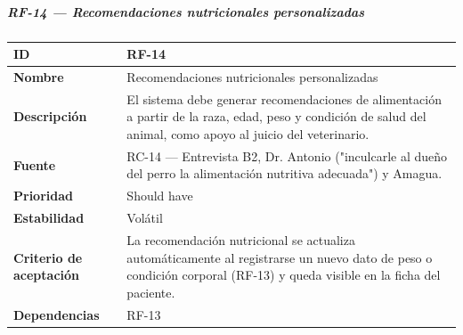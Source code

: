 \subparagraph{RF-14 --- Recomendaciones nutricionales
personalizadas}\label{rf-14-recomendaciones-nutricionales-personalizadas}

{\def\LTcaptype{none} %
\begin{longtable}[]{@{}
  >{\raggedright\arraybackslash}p{}
  >{\raggedright\arraybackslash}p{}@{}}
\toprule\noalign{}
\begin{minipage}[b]{\linewidth}\raggedright
\textbf{ID}
\end{minipage} & \begin{minipage}[b]{\linewidth}\raggedright
RF-14
\end{minipage} \\
\midrule\noalign{}
\endhead
\bottomrule\noalign{}
\endlastfoot
\textbf{Nombre} & \begin{minipage}[t]{\linewidth}\raggedright
Recomendaciones nutricionales personalizadas
\end{minipage} \\
\textbf{Descripción} & \begin{minipage}[t]{\linewidth}\raggedright
El sistema debe generar recomendaciones de alimentación a partir de la
raza, edad, peso y condición de salud del animal, como apoyo al juicio
del veterinario.
\end{minipage} \\
\textbf{Fuente} & \begin{minipage}[t]{\linewidth}\raggedright
RC-14 --- Entrevista B2, Dr. Antonio ("inculcarle al dueño del perro la
alimentación nutritiva adecuada") y Amagua.
\end{minipage} \\
\textbf{Prioridad} & \begin{minipage}[t]{\linewidth}\raggedright
Should have
\end{minipage} \\
\textbf{Estabilidad} & \begin{minipage}[t]{\linewidth}\raggedright
Volátil
\end{minipage} \\
\textbf{Criterio de aceptación} &
\begin{minipage}[t]{\linewidth}\raggedright
La recomendación nutricional se actualiza automáticamente al registrarse
un nuevo dato de peso o condición corporal (RF-13) y queda visible en la
ficha del paciente.
\end{minipage} \\
\textbf{Dependencias} & \begin{minipage}[t]{\linewidth}\raggedright
RF-13
\end{minipage} \\
\end{longtable}
}

